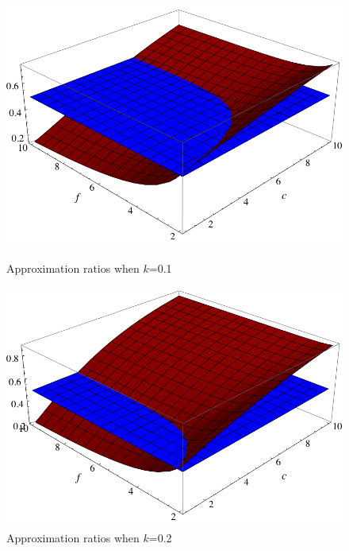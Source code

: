 \begin{figure}[h]
\begin{minipage}[h]{0.45\linewidth}
\centering
\includegraphics[width=\textwidth]{k=0_1.png}
\caption{Approximation ratios when $k$=0.1}
\end{minipage}
\hspace{0.5cm}
\begin{minipage}[h]{0.45\linewidth}
\centering
\includegraphics[width=\textwidth]{k=0_2.png}
\caption{Approximation ratios when $k$=0.2}
\end{minipage}
\end{figure}
